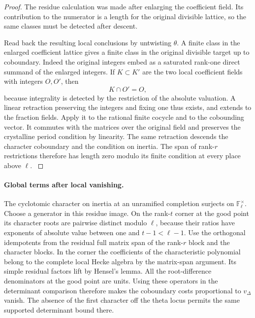 \begin{proof}
The residue calculation was made after enlarging the coefficient field. Its contribution to the numerator is a length for the original divisible lattice, so the same classes must be detected after descent.

Read back the resulting local conclusions by untwisting
\(\theta\). A finite class in the enlarged coefficient lattice
gives a finite class in the original divisible target up to
coboundary. Indeed the original integers embed as a saturated
rank-one direct summand of the enlarged integers. If \(K\subset K'\) are the two local coefficient fields with integers \(O,O'\), then
\[
 K\cap O'=O,
\]
because integrality is detected by the restriction of the absolute valuation. A linear retraction preserving
the integers and fixing one thus exists, and extends to the
fraction fields. Apply it to the rational finite cocycle and to
the cobounding vector. It commutes with the matrices over the
original field and preserves the crystalline period condition by
linearity. The same retraction descends the character coboundary
and the condition on inertia. The span of rank-\(r\) restrictions
therefore has length zero modulo its finite condition at every
place above \(\ell\). \label{cor:large-prime-length-6}
\end{proof}

\paragraph{Global terms after local vanishing.}
The cyclotomic character on inertia at an unramified completion
surjects on \(\mathbb F_\ell^\times\). Choose a generator in
this residue image. On the rank-\(t\) corner at the good point
its character roots are pairwise distinct modulo \(\ell\),
because their ratios have exponents of absolute value between
one and \(t-1<\ell-1\). Use the orthogonal idempotents from
the residual full matrix span of the rank-\(r\) block and the
character blocks. In the corner the coefficients of the
characteristic polynomial belong to the complete local Hecke
algebra by the matrix-span argument. Its simple residual factors
lift by Hensel's lemma. All the root-difference denominators at
the good point are units. Using these operators in the
determinant comparison therefore makes the coboundary costs
proportional to \(v_\Delta\) vanish. The absence of the first
character off the theta locus permits the same supported
determinant bound there. \label{cor:large-prime-length-7}

